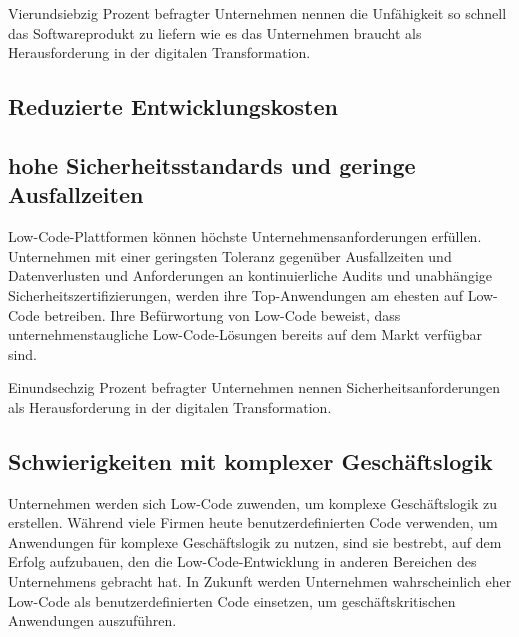 \documentclass{article}
\begin{document}
	Vierundsiebzig Prozent befragter Unternehmen nennen die Unfähigkeit so schnell das Softwareprodukt zu liefern wie es das Unternehmen braucht als Herausforderung in der digitalen Transformation. \cite{EmmaVanPelt.2019} %
	
	\subsection{Reduzierte Entwicklungskosten}
	
	\subsection{hohe Sicherheitsstandards und geringe Ausfallzeiten} 
	Low-Code-Plattformen können höchste Unternehmensanforderungen erfüllen. Unternehmen mit einer geringsten Toleranz gegenüber Ausfallzeiten und Datenverlusten und Anforderungen an kontinuierliche Audits und unabhängige Sicherheitszertifizierungen, werden ihre Top-Anwendungen am ehesten auf
	Low-Code betreiben. Ihre Befürwortung von Low-Code beweist, dass unternehmenstaugliche 	Low-Code-Lösungen bereits auf dem Markt verfügbar sind.  \cite{EmmaVanPelt.2019}
	
	Einundsechzig Prozent befragter Unternehmen nennen Sicherheitsanforderungen als Herausforderung in der digitalen Transformation. \cite{EmmaVanPelt.2019} %
	
	
	
	\subsection{Schwierigkeiten mit komplexer Geschäftslogik}
	Unternehmen werden sich Low-Code zuwenden, um komplexe Geschäftslogik zu erstellen.
	Während viele Firmen heute benutzerdefinierten Code verwenden, um Anwendungen für komplexe
	Geschäftslogik zu nutzen, sind sie bestrebt, auf dem Erfolg aufzubauen, den die Low-Code-Entwicklung in anderen Bereichen des Unternehmens gebracht hat. In Zukunft werden Unternehmen wahrscheinlich eher Low-Code als benutzerdefinierten Code einsetzen, um geschäftskritischen Anwendungen auszuführen. \cite{EmmaVanPelt.2019}
	
\end{document}
